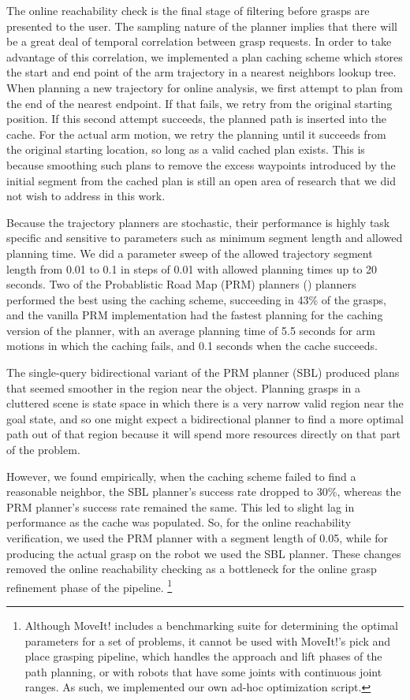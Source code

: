 The online reachability check is the final stage of filtering before grasps are presented to the user. The sampling nature of the planner implies that there will be a great deal of temporal correlation between grasp requests. In order to take advantage of this correlation, we implemented a plan caching scheme which stores the start and end point of the arm trajectory in a nearest neighbors lookup tree. When planning a new trajectory for online analysis, we first attempt to plan from the end of the nearest endpoint. If that fails, we retry from the original starting position. If this second attempt succeeds, the planned path is inserted into the cache. For the actual arm motion, we retry the planning until it succeeds from the original starting location, so long as a valid cached plan exists. This is because smoothing such plans to remove the excess waypoints introduced by the initial segment from the cached plan is still an open area of research that we did not wish to address in this work.  

Because the trajectory planners are stochastic, their performance is highly task specific and sensitive to parameters such as minimum segment length and allowed planning time. We did a parameter sweep of the allowed trajectory segment length from 0.01 to 0.1 in steps of 0.01 with allowed planning times up to 20 seconds. Two of the Probablistic Road Map (PRM) planners (\cite{PRM}) planners performed the best using the caching scheme, succeeding in 43\% of the grasps, and the vanilla PRM implementation had the fastest planning for the caching version of the planner, with an average planning time of 5.5 seconds for arm motions in which the caching fails, and 0.1 seconds when the cache succeeds. 

The single-query bidirectional variant of the PRM planner (SBL) produced plans that seemed smoother in the region near the object. Planning grasps in a cluttered scene is state space in which there is a very narrow valid region near the goal state, and so one might expect a bidirectional planner to find a more optimal path out of that region because it will spend more resources directly on that part of the problem. 

However, we found empirically, when the caching scheme failed to find a reasonable neighbor, the SBL planner's success rate dropped to 30\%, whereas the PRM planner's success rate remained the same. This led to slight lag in performance as the cache was populated. So, for the online reachability verification, we used the PRM planner with a segment length of 0.05, while for producing the actual grasp on the robot we used the SBL planner. These changes removed the online reachability checking as a bottleneck for the online grasp refinement phase of the pipeline. \footnote{Although MoveIt! includes a benchmarking suite for determining the optimal parameters for a set of problems, it cannot be used with MoveIt!'s pick and place grasping pipeline, which handles the approach and lift phases of the path planning, or with robots that have some joints with continuous joint ranges. As such, we implemented our own ad-hoc optimization script.}

